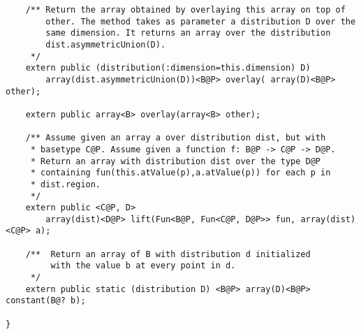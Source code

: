 \documentclass{article}
\begin{document}
{\begin{verbatim}
    /** Return the array obtained by overlaying this array on top of
        other. The method takes as parameter a distribution D over the
        same dimension. It returns an array over the distribution
        dist.asymmetricUnion(D).
     */
    extern public (distribution(:dimension=this.dimension) D)  
        array(dist.asymmetricUnion(D))<B@P> overlay( array(D)<B@P> other);

    extern public array<B> overlay(array<B> other);

    /** Assume given an array a over distribution dist, but with
     * basetype C@P. Assume given a function f: B@P -> C@P -> D@P.
     * Return an array with distribution dist over the type D@P
     * containing fun(this.atValue(p),a.atValue(p)) for each p in
     * dist.region.
     */
    extern public <C@P, D> 
        array(dist)<D@P> lift(Fun<B@P, Fun<C@P, D@P>> fun, array(dist)<C@P> a);

    /**  Return an array of B with distribution d initialized
         with the value b at every point in d.
     */
    extern public static (distribution D) <B@P> array(D)<B@P> constant(B@? b);

}
\end{verbatim}}
\end{document}
